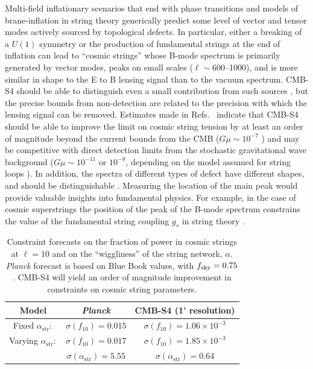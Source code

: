 Multi-field inflationary scenarios that end with phase transitions \cite{Hindmarsh:1994re,Vilenkin:1981iu,Kofman:1995fi,Tkachev:1998dc,Jeannerot:1995yn,Jeannerot:2003qv,Rocher:2004my} and models of brane-inflation in string theory \cite{Sarangi:2002yt,Jones:2003da,Copeland:2003bj} generically predict some level of vector and tensor modes actively sourced by topological defects. In particular, either a breaking of a $U(1)$ symmetry or the production of fundamental strings at the end of inflation can lead to ``cosmic strings'' whose B-mode spectrum is primarily generated by vector modes, peaks on small scales ($\ell\sim 600$--1000), and is more similar in shape to the E to B lensing signal than to the vacuum spectrum. CMB-S4 should be able to distinguish even a small contribution from such sources \cite{Urrestilla:2008jv}, but the precise bounds from non-detection are related to the precision with which the lensing signal can be removed. Estimates made in Refs.~\cite{Seljak:2006hi,Avgoustidis:2011ax} indicate that CMB-S4 should be able to improve the limit on cosmic string tension by at least an order of magnitude beyond the current bounds from the CMB ($G\mu\sim10^{-7}$ \cite{Ade:2013xla,Ade:2015ava,Ade:2015xua}) and may be competitive with direct detection limits from the stochastic gravitational wave background ($G\mu\sim10^{-11}$ or $10^{-8}$, depending on the model assumed for string loops \cite{Arzoumanian:2015liz}). In addition, the spectra of different types of defect have different shapes, and should be distinguishable \cite{Urrestilla:2007sf,Avgoustidis:2011ax}. Measuring the location of the main peak would provide valuable insights into fundamental physics. For example, in the case of cosmic superstrings the position of the peak of the B-mode spectrum constrains the value of the fundamental string coupling $g_s$ in string theory \cite{Avgoustidis:2011ax}. 

\begin{table}[htbp!]\label{tab:string_forecast}
  \begin{center}
    \begin{tabular}{ c || c | c }
      \hline
       Model & {\it Planck} & CMB-S4 (1' resolution)  \\ \hline \hline
       Fixed $\alpha_\mathrm{str}:$ & $\sigma(f_{10})= 0.015$ & $\sigma(f_{10})=1.06\times 10^{-3}$  \\ \hline
       Varying $\alpha_\mathrm{str}:$ & $\sigma(f_{10})= 0.017$ & $\sigma(f_{10})=1.85\times 10^{-3}$ \\
        & $\sigma(\alpha_\mathrm{str})= 5.55$ & $\sigma(\alpha_\mathrm{str})=0.64$ \\\hline \hline
    \end{tabular}
  \end{center}
  \caption{Constraint forecasts on the fraction of power in cosmic strings at $\ell=10$ and on the ``wiggliness'' of the string network, $\alpha$. {\it Planck\/} forecast is based on Blue Book values, with $f_{\rm sky} = 0.75$. CMB-S4 will yield an order of magnitude improvement in constraints on cosmic string parameters.}
\end{table}

